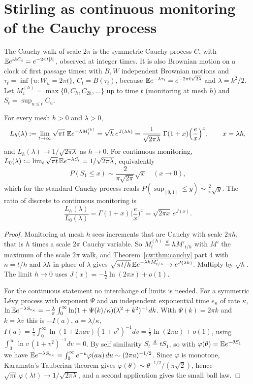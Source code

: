 \section{Stirling as continuous monitoring of the Cauchy process}\label{cw:sec:monitor}

The Cauchy walk of scale $2\pi$ is the symmetric Cauchy process $C$, with $\mathbb{E} e^{ikC_t}=e^{-2\pi t|k|}$, observed at integer times. It is also Brownian motion on a clock of first passage times: with $B,W$ independent Brownian motions and $\tau_t=\inf\{u:W_u=2\pi t\}$, $C_t=B(\tau_t)$, because $\mathbb{E} e^{-\lambda\tau_t}=e^{-2\pi t\sqrt{2\lambda}}$ and $\lambda=k^2/2$. Let $M^{(h)}_t=\max\{0,C_h,C_{2h},\dots\}$ up to time $t$ (monitoring at mesh $h$) and $S_t=\sup_{u\le t}C_u$.

\begin{theorem}[proved]\label{cw:thm:monitor}
For every mesh $h>0$ and $\lambda>0$,
\[
L_h(\lambda):=\lim_{t\to\infty}\sqrt{\pi t}\;\mathbb{E} e^{-\lambda M^{(h)}_t}=\sqrt h\,e^{J(\lambda h)}=\frac{1}{\sqrt{2\pi\lambda}}\;\Gamma(1+x)\Big(\frac ex\Big)^x,\qquad x=\lambda h,
\]
and $L_h(\lambda)\to1/\sqrt{2\pi\lambda}$ as $h\to0$. For continuous monitoring, $L_0(\lambda):=\lim_t\sqrt{\pi t}\,\mathbb{E} e^{-\lambda S_t}=1/\sqrt{2\pi\lambda}$, equivalently
\[
P(S_1\le x)\sim\frac{2}{\pi\sqrt{2\pi}}\sqrt x\quad(x\to0),
\]
which for the standard Cauchy process reads $P(\sup_{[0,1]}\le y)\sim\frac2\pi\sqrt y$. The ratio of discrete to continuous monitoring is
\[
\frac{L_h(\lambda)}{L_0(\lambda)}=\Gamma(1+x)\Big(\frac ex\Big)^x=\sqrt{2\pi x}\,e^{J(x)}.
\]
\end{theorem}

\begin{proof}
Monitoring at mesh $h$ sees increments that are Cauchy with scale $2\pi h$, that is $h$ times a scale $2\pi$ Cauchy variable. So $M^{(h)}_t\overset{d}{=}hM'_{t/h}$ with $M'$ the maximum of the scale $2\pi$ walk, and Theorem~\ref{cw:thm:cauchy} part 4 with $n=t/h$ and $\lambda h$ in place of $\lambda$ gives $\sqrt{\pi t/h}\,\mathbb{E} e^{-\lambda hM'_{t/h}}\to e^{J(\lambda h)}$. Multiply by $\sqrt h$. The limit $h\to0$ uses $J(x)=-\tfrac12\ln(2\pi x)+o(1)$.

For the continuous statement no interchange of limits is needed. For a symmetric L\'evy process with exponent $\Psi$ and an independent exponential time $e_\kappa$ of rate $\kappa$, $\ln\mathbb{E} e^{-\lambda S_{e_\kappa}}=-\frac\lambda\pi\int_0^\infty\ln(1+\Psi(k)/\kappa)(\lambda^2+k^2)^{-1}dk$. With $\Psi(k)=2\pi k$ and $k=\lambda v$ this is $-I(a)$, $a=\lambda/\kappa$, $I(a)=\frac1\pi\int_0^\infty\ln(1+2\pi av)(1+v^2)^{-1}dv=\frac12\ln(2\pi a)+o(1)$, using $\int_0^\infty\ln v\,(1+v^2)^{-1}dv=0$. By self similarity $S_t\overset{d}{=}tS_1$, so with $\varphi(\theta)=\mathbb{E} e^{-\theta S_1}$ we have $\mathbb{E} e^{-\lambda S_{e_\kappa}}=\int_0^\infty e^{-u}\varphi(au)\,du\sim(2\pi a)^{-1/2}$. Since $\varphi$ is monotone, Karamata's Tauberian theorem gives $\varphi(\theta)\sim\theta^{-1/2}/(\pi\sqrt2)$, hence $\sqrt{\pi t}\,\varphi(\lambda t)\to1/\sqrt{2\pi\lambda}$, and a second application gives the small ball law.
\end{proof}

